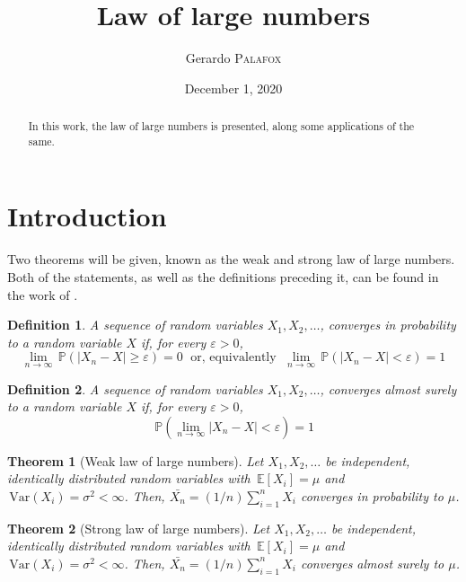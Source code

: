 \documentclass[letterpaper, 10 pt, conference]{article}
\title{Law of large numbers
}
\date{December 1, 2020}
\author{Gerardo {\textsc{Palafox}}}
\newtheorem{thm}{Theorem}
\newtheorem{defn}{Definition}
\newcommand\var[1]{\, \mathrm{Var} \left( #1 \right)}
\newcommand\pr[1]{\, \mathbb{P} \left( #1 \right)}
\newcommand\expec[1]{\, \mathbb{E} \left\lbrack #1 \right\rbrack}
\begin{document}
\maketitle
\begin{abstract}
	In this work, the law of large numbers is presented, along some applications of the same.
\end{abstract}
\section{Introduction}
 Two theorems will be given, known as the weak and strong law of large numbers. Both of the statements, as well as the definitions preceding it, can be found in the work of \citet{Casella_Berger_2002}. 
 
\begin{defn}\label{defn:converge_probability}
	A sequence of random variables $X_1, X_2, \dots$, converges in probability to a random variable $X$ if, for every $\varepsilon > 0$, 
	\begin{equation}
		\lim_{n \rightarrow \infty} \pr{|X_n - X| \geq \varepsilon } = 0 \; \text{ or, equivalently } \; \lim_{n \rightarrow \infty} \pr{|X_n - X| < \varepsilon } = 1
	\end{equation}
\end{defn}

\begin{defn}\label{defn:converge_as}
	A sequence of random variables $X_1, X_2, \dots$, converges almost surely to a random variable $X$ if, for every $\varepsilon > 0$, 
	\begin{equation}
		\pr{\lim_{n \rightarrow \infty} |X_n -X| < \varepsilon} = 1
	\end{equation}
\end{defn}

\begin{thm}[Weak law of large numbers]\label{thm:weak_lln}
	Let $X_1, X_2, \dots$ be independent, identically distributed random variables with $\expec{X_i} = \mu$ and $\var{X_i} = \sigma^2 < \infty$. Then, $\bar{X_n} = (1/n) \sum_{i = 1}^{n} X_i$ converges in probability to $\mu$.
\end{thm}

\begin{thm}[Strong law of large numbers]\label{thm:strong_lln}
	Let $X_1, X_2, \dots$ be independent, identically distributed random variables with $\expec{X_i} = \mu$ and $\var{X_i} = \sigma^2 < \infty$. Then, $\bar{X_n} = (1/n) \sum_{i = 1}^{n} X_i$ converges almost surely to $\mu$.
\end{thm}
\end{document}
